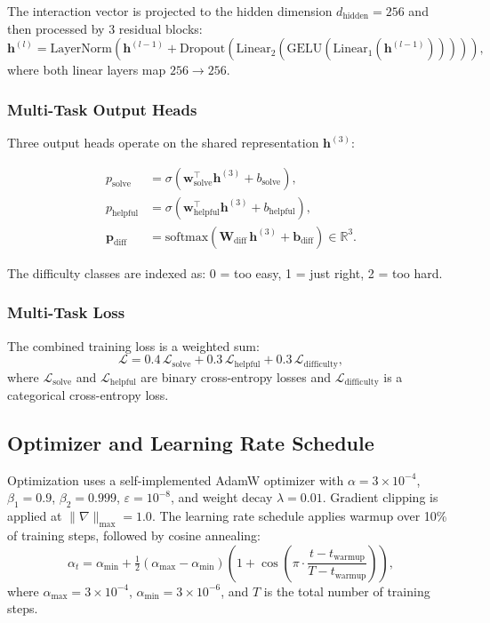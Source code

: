 \documentclass[12pt]{article}
\begin{document}
The interaction vector is projected to the hidden dimension $d_{\text{hidden}} = 256$ and then processed by 3 residual blocks:
\begin{equation}
\mathbf{h}^{(l)} = \text{LayerNorm}\!\left(\mathbf{h}^{(l-1)} + \text{Dropout}(\text{Linear}_2(\text{GELU}(\text{Linear}_1(\mathbf{h}^{(l-1)}))))\right),
\end{equation}
where both linear layers map $256 \to 256$.

\subsubsection{Multi-Task Output Heads}

Three output heads operate on the shared representation $\mathbf{h}^{(3)}$:

\begin{align}
p_{\text{solve}} &= \sigma(\mathbf{w}_{\text{solve}}^\top \mathbf{h}^{(3)} + b_{\text{solve}}), \\
p_{\text{helpful}} &= \sigma(\mathbf{w}_{\text{helpful}}^\top \mathbf{h}^{(3)} + b_{\text{helpful}}), \\
\mathbf{p}_{\text{diff}} &= \text{softmax}(\mathbf{W}_{\text{diff}}\,\mathbf{h}^{(3)} + \mathbf{b}_{\text{diff}}) \in \mathbb{R}^3.
\end{align}

The difficulty classes are indexed as: 0 = too easy, 1 = just right, 2 = too hard.

\subsubsection{Multi-Task Loss}

The combined training loss is a weighted sum:
\begin{equation}
\mathcal{L} = 0.4\,\mathcal{L}_{\text{solve}} + 0.3\,\mathcal{L}_{\text{helpful}} + 0.3\,\mathcal{L}_{\text{difficulty}},
\end{equation}
where $\mathcal{L}_{\text{solve}}$ and $\mathcal{L}_{\text{helpful}}$ are binary cross-entropy losses and $\mathcal{L}_{\text{difficulty}}$ is a categorical cross-entropy loss.

\subsection{Optimizer and Learning Rate Schedule}

Optimization uses a self-implemented AdamW optimizer with $\alpha = 3 \times 10^{-4}$, $\beta_1 = 0.9$, $\beta_2 = 0.999$, $\varepsilon = 10^{-8}$, and weight decay $\lambda = 0.01$. Gradient clipping is applied at $\|\nabla\|_{\max} = 1.0$. The learning rate schedule applies warmup over 10\% of training steps, followed by cosine annealing:
\begin{equation}
\alpha_t = \alpha_{\min} + \tfrac{1}{2}(\alpha_{\max} - \alpha_{\min})\left(1 + \cos\!\left(\pi \cdot \frac{t - t_{\text{warmup}}}{T - t_{\text{warmup}}}\right)\right),
\end{equation}
where $\alpha_{\max} = 3 \times 10^{-4}$, $\alpha_{\min} = 3 \times 10^{-6}$, and $T$ is the total number of training steps.
\end{document}
